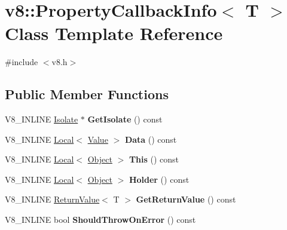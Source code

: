 \hypertarget{classv8_1_1_property_callback_info}{}\section{v8\+:\+:Property\+Callback\+Info$<$ T $>$ Class Template Reference}
\label{classv8_1_1_property_callback_info}


{\ttfamily \#include $<$v8.\+h$>$}

\subsection*{Public Member Functions}
\begin{DoxyCompactItemize}
\item 
V8\+\_\+\+I\+N\+L\+I\+NE \hyperlink{classv8_1_1_isolate}{Isolate} $\ast$ {\bfseries Get\+Isolate} () const \hypertarget{classv8_1_1_property_callback_info_a066d0c9eee98f80fb78d97961eafa8ad}{}\label{classv8_1_1_property_callback_info_a066d0c9eee98f80fb78d97961eafa8ad}

\item 
V8\+\_\+\+I\+N\+L\+I\+NE \hyperlink{classv8_1_1_local}{Local}$<$ \hyperlink{classv8_1_1_value}{Value} $>$ {\bfseries Data} () const \hypertarget{classv8_1_1_property_callback_info_a64edbaeb902e360fc2a4d353c8c4930f}{}\label{classv8_1_1_property_callback_info_a64edbaeb902e360fc2a4d353c8c4930f}

\item 
V8\+\_\+\+I\+N\+L\+I\+NE \hyperlink{classv8_1_1_local}{Local}$<$ \hyperlink{classv8_1_1_object}{Object} $>$ {\bfseries This} () const \hypertarget{classv8_1_1_property_callback_info_a747202a7d4db0b930f19f9466c3a5acb}{}\label{classv8_1_1_property_callback_info_a747202a7d4db0b930f19f9466c3a5acb}

\item 
V8\+\_\+\+I\+N\+L\+I\+NE \hyperlink{classv8_1_1_local}{Local}$<$ \hyperlink{classv8_1_1_object}{Object} $>$ {\bfseries Holder} () const \hypertarget{classv8_1_1_property_callback_info_a8eb97205ce7bd25b446b03643d02570d}{}\label{classv8_1_1_property_callback_info_a8eb97205ce7bd25b446b03643d02570d}

\item 
V8\+\_\+\+I\+N\+L\+I\+NE \hyperlink{classv8_1_1_return_value}{Return\+Value}$<$ T $>$ {\bfseries Get\+Return\+Value} () const \hypertarget{classv8_1_1_property_callback_info_a4e9bc4da66ed3ea21aac7dbb9c11465b}{}\label{classv8_1_1_property_callback_info_a4e9bc4da66ed3ea21aac7dbb9c11465b}

\item 
V8\+\_\+\+I\+N\+L\+I\+NE bool {\bfseries Should\+Throw\+On\+Error} () const \hypertarget{classv8_1_1_property_callback_info_a6b5104e088ca57f80be66435d6b2f0e2}{}\label{classv8_1_1_property_callback_info_a6b5104e088ca57f80be66435d6b2f0e2}

\end{DoxyCompactItemize}
